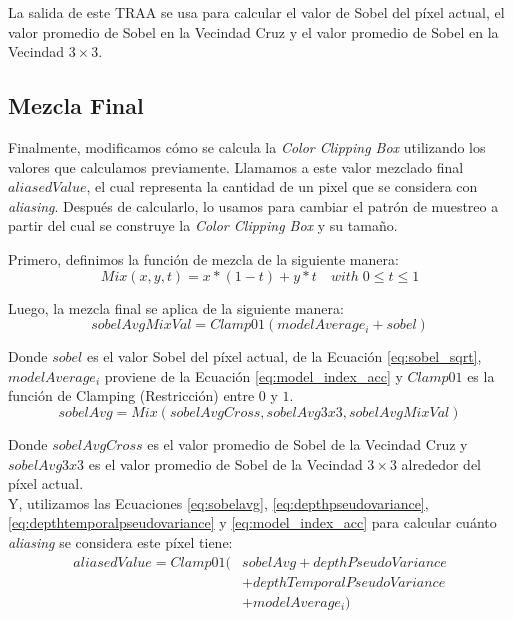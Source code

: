 \documentclass[pregrado]{tesis-usb} %
\begin{document}
La salida de este TRAA se usa para calcular el valor de Sobel del píxel actual, el valor promedio de Sobel en la Vecindad Cruz y el valor promedio de Sobel en la Vecindad $3\times 3$.

\subsection{Mezcla Final}
Finalmente, modificamos cómo se calcula la \textit{Color Clipping Box} utilizando los valores que calculamos previamente. Llamamos a este valor mezclado final $aliasedValue$, el cual representa la cantidad de un pixel que se considera con \textit{aliasing}. Después de calcularlo, lo usamos para cambiar el patrón de muestreo a partir del cual se construye la \textit{Color Clipping Box} y su tamaño.

Primero, definimos la función de mezcla de la siguiente manera:
\begin{equation} \label{eq:mixfunction}
Mix(x,y,t)=x*(1-t)+y*t\quad with\; 0\leq t\leq 1
\end{equation} 

Luego, la mezcla final se aplica de la siguiente manera:
\begin{equation}\label{eq:sobelavgmixval}
sobelAvgMixVal=Clamp01(modelAverage_i+sobel) 
\end{equation}
 
Donde $sobel$ es el valor Sobel del píxel actual, de la Ecuación \ref{eq:sobel_sqrt}, $modelAverage_i$ proviene de la Ecuación \ref{eq:model_index_acc} y $Clamp01$ es la función de Clamping (Restricción) entre $0$ y $1$. \\

\begin{equation}\label{eq:sobelavg}
sobelAvg=Mix(sobelAvgCross, sobelAvg3x3, sobelAvgMixVal)
\end{equation}

Donde $sobelAvgCross$ es el valor promedio de Sobel de la Vecindad Cruz y $sobelAvg3x3$ es el valor promedio de Sobel de la Vecindad $3\times 3$ alrededor del píxel actual. \\ 

Y, utilizamos las Ecuaciones \ref{eq:sobelavg}, \ref{eq:depthpseudovariance}, \ref{eq:depthtemporalpseudovariance} y \ref{eq:model_index_acc} para calcular cuánto \textit{aliasing} se considera este píxel tiene:
\begin{equation}\label{eq:aliasedvalue}
\begin{split}
aliasedValue=Clamp01 (& sobelAvg + depthPseudoVariance \\
 & + depthTemporalPseudoVariance \\
 & + modelAverage_i)
\end{split}
\end{equation}
\end{document}
